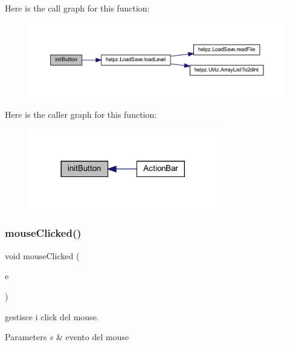 Here is the call graph for this function\+:
\nopagebreak
\begin{figure}[H]
\begin{center}
\leavevmode
\includegraphics[width=350pt]{classui_1_1_action_bar_aed9fe7e919d4355a7ad86701d44e1fea_cgraph}
\end{center}
\end{figure}
Here is the caller graph for this function\+:\nopagebreak
\begin{figure}[H]
\begin{center}
\leavevmode
\includegraphics[width=233pt]{classui_1_1_action_bar_aed9fe7e919d4355a7ad86701d44e1fea_icgraph}
\end{center}
\end{figure}
\mbox{\label{classui_1_1_action_bar_a45d56bd84238e8b56589dfc732e2b2cf}} 
\subsubsection{\texorpdfstring{mouse\+Clicked()}{mouseClicked()}}
{\footnotesize\ttfamily void mouse\+Clicked (\begin{DoxyParamCaption}\item[{Mouse\+Event}]{e }\end{DoxyParamCaption})}



gestisce i click del mouse. 


\begin{DoxyParams}{Parameters}
{\em e} & evento del mouse \\
\hline
\end{DoxyParams}


